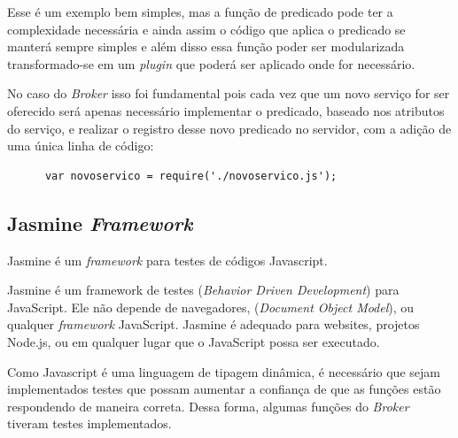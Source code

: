Esse é um exemplo bem simples, mas a função de predicado pode ter a complexidade necessária e ainda assim o código que aplica o predicado se manterá sempre simples e além disso essa função poder ser modularizada transformado-se em um \textit{plugin} que poderá ser aplicado onde for necessário.

No caso do \textit{Broker} isso foi fundamental pois cada vez que um novo serviço for ser oferecido será apenas necessário implementar o predicado, baseado nos atributos do serviço, e realizar o registro desse novo predicado no servidor, com a adição de uma única linha de código:

\begin{footnotesize}
  \begin{verbatim}
      var novoservico = require('./novoservico.js');
  \end{verbatim}
\end{footnotesize}

\subsection{Jasmine \normalfont\itshape Framework}
Jasmine é um \textit{framework} para testes de códigos Javascript.
\begin{citacao}
Jasmine é um framework de testes  (\textit{Behavior Driven Development}) para JavaScript. Ele não depende de navegadores,  (\textit{Document Object Model}), ou qualquer \textit{framework} JavaScript. Jasmine é adequado para websites, projetos Node.js, ou em qualquer lugar que o JavaScript possa ser executado.\cite{jasmine}
\end{citacao}

Como Javascript é uma linguagem de tipagem dinâmica, é necessário que sejam implementados testes que possam aumentar a confiança de que as funções estão respondendo de maneira correta.
Dessa forma, algumas funções do \textit{Broker} tiveram testes implementados.

